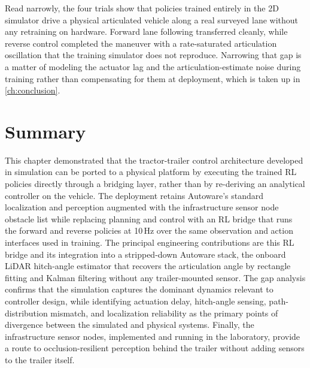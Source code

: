 Read narrowly, the four trials show that policies trained entirely in the 2D simulator drive a physical articulated vehicle along a real surveyed lane without any retraining on hardware. Forward lane following transferred cleanly, while reverse control completed the maneuver with a rate-saturated articulation oscillation that the training simulator does not reproduce. Narrowing that gap is a matter of modeling the actuator lag and the articulation-estimate noise during training rather than compensating for them at deployment, which is taken up in \cref{ch:conclusion}.

\section{Summary}

This chapter demonstrated that the tractor-trailer control architecture developed in simulation can be ported to a physical platform by executing the trained RL policies directly through a bridging layer, rather than by re-deriving an analytical controller on the vehicle. The deployment retains Autoware's standard localization and perception augmented with the infrastructure sensor node obstacle list while replacing planning and control with an RL bridge that runs the forward and reverse policies at 10\,Hz over the same observation and action interfaces used in training. The principal engineering contributions are this RL bridge and its integration into a stripped-down Autoware stack, the onboard LiDAR hitch-angle estimator that recovers the articulation angle by rectangle fitting and Kalman filtering without any trailer-mounted sensor. The gap analysis confirms that the simulation captures the dominant dynamics relevant to controller design, while identifying actuation delay, hitch-angle sensing, path-distribution mismatch, and localization reliability as the primary points of divergence between the simulated and physical systems. Finally, the infrastructure sensor nodes, implemented and running in the laboratory, provide a route to occlusion-resilient perception behind the trailer without adding sensors to the trailer itself.
